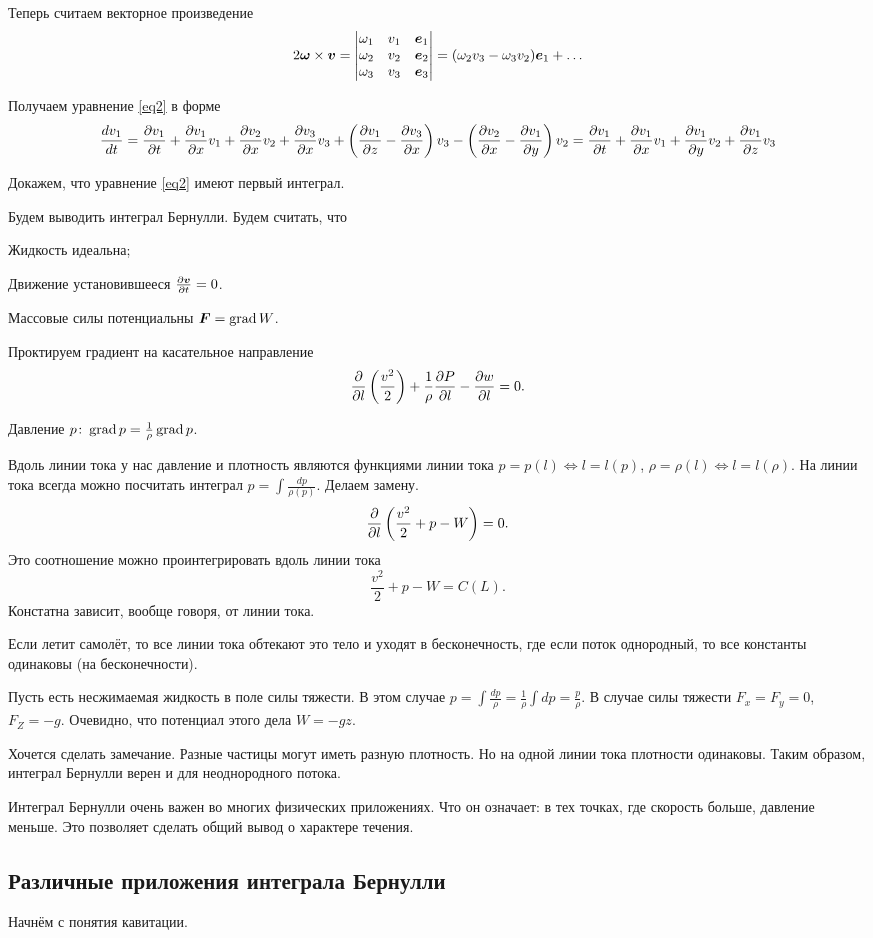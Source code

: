 Теперь считаем векторное произведение
\[ 2\boldsymbol{\omega}\times\boldsymbol{v} = 
\begin{vmatrix}\omega_1&v_1&\boldsymbol{e}_1\\\omega_2&v_2&\boldsymbol{e}_2\\\omega_3&v_3&\boldsymbol{e}_3\end{vmatrix}=(\omega_2v_3 - \omega_3v_2)\boldsymbol{e}_1+\ldots\]

Получаем уравнение \eqref{eq2} в форме
\[
  \frac{ d v_1}{dt} = \frac{\partial v_1}{\partial t}+\frac{\partial v_1}{\partial x}v_1+\frac{\partial v_2}{\partial x}v_2+\frac{\partial v_3}{\partial x}v_3 + \left(\frac{\partial v_1}{\partial z}-\frac{\partial v_3}{\partial x}\right)v_3-\left(\frac{\partial v_2}{\partial x}-\frac{\partial v_1}{\partial y}\right)v_2 = \frac{\partial v_1}{\partial t} + \frac{\partial v_1}{\partial x}v_1+\frac{\partial v_1}{\partial y}v_2+\frac{\partial v_1}{\partial z}v_3
\]


Докажем, что уравнение \eqref{eq2} имеют первый интеграл.

Будем выводить интеграл Бернулли.
Будем считать, что 
\begin{roItems}
 \item Жидкость идеальна;
 \item Движение установившееся $\frac{\partial \boldsymbol{v}}{\partial t} =0$.
 \item Массовые силы потенциальны $\boldsymbol{F} = \operatorname{grad} W$.
\end{roItems}

Проктируем градиент на касательное направление
\[\frac{\partial }{\partial l}\left(\frac{v^2}2\right)+\frac1{\rho}\frac{\partial P}{\partial l}-\frac{\partial w}{\partial l}=0.\]

Давление $p\colon \operatorname{grad} p=\frac1\rho\operatorname{grad} p$.

Вдоль линии тока у нас давление и плотность являются функциями линии тока $p = p(l)\iff l = l(p)$, $\rho=\rho(l)\iff l = l(\rho)$. На линии тока всегда можно посчитать интеграл $p=\int\frac{dp}{\rho(p)}$. Делаем замену.
\[\frac{\partial }{\partial l}\left(\frac{v^2}2+p-W\right)=0.\]
Это соотношение можно проинтегрировать вдоль линии тока
\[\frac{v^2}2+p-W=C(L).\]
Констатна зависит, вообще говоря, от линии тока.

Если летит самолёт, то все линии тока обтекают это тело и уходят в бесконечность, где если поток однородный, то все константы одинаковы (на бесконечности).

Пусть есть несжимаемая жидкость в поле силы тяжести. В этом случае $p=\int\frac{dp}\rho=\frac1\rho\int dp=\frac p\rho$. В случае силы тяжести $F_x=F_y=0$, $F_Z=-g$. Очевидно, что потенциал этого дела $W=-gz$.

Хочется сделать замечание. Разные частицы могут иметь разную плотность. Но на одной линии тока плотности одинаковы. Таким образом, интеграл Бернулли верен и для неоднородного потока.

Интеграл Бернулли очень важен во многих физических приложениях. Что он означает: в тех точках, где скорость больше, давление меньше. Это позволяет сделать общий вывод о характере течения.

\subsection{Различные приложения интеграла Бернулли}
Начнём с понятия кавитации.

